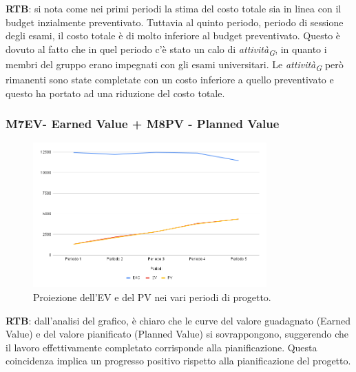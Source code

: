 \textbf{RTB}: si nota come nei primi periodi la stima del costo totale sia in linea con il budget inzialmente preventivato. Tuttavia al quinto periodo, periodo di sessione degli esami, il costo totale è di molto inferiore al budget preventivato. Questo è dovuto al fatto che in quel periodo c'è stato un calo di \textit{attività}\textsubscript{\textit{G}}, in quanto i membri del gruppo erano impegnati con gli esami universitari. Le \textit{attività}\textsubscript{\textit{G}} però rimanenti sono state completate con un costo inferiore a quello preventivato e questo ha portato ad una riduzione del costo totale.\\

\subsubsection{M7EV- Earned Value + M8PV - Planned Value} 
\begin{figure}[H]
    \centering
    \includegraphics[width=0.8\textwidth]{../Images/PianoDiQualifica/EV_PV.png}
    \caption{Proiezione dell’EV e del PV nei vari periodi di progetto.}
    \label{fig:3}
\end{figure}

\textbf{RTB}: dall'analisi del grafico, è chiaro che le curve del valore guadagnato (Earned Value) e del valore pianificato (Planned Value) si sovrappongono, suggerendo che il lavoro effettivamente completato corrisponde alla pianificazione. Questa coincidenza implica un progresso positivo rispetto alla pianificazione del progetto.

